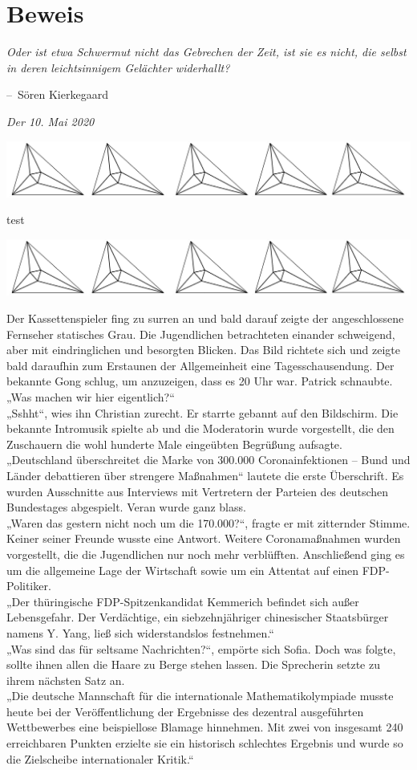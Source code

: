 \documentclass[oneside]{memoir}
\makeatletter
\newcommand{\parasep}{
\bigskip
\bigskip
\begin{center} 
   \includegraphics[scale=.08]{parasep5.jpg} 
\end{center}
\bigskip
\bigskip
}
\newenvironment{chapquote}[2][2em]
  {\setlength{\@tempdima}{#1}%
   \def\chapquote@author{#2}%
   \parshape 1 \@tempdima \dimexpr\textwidth-2\@tempdima\relax%
   \itshape}
  {\par\normalfont\hfill--\ \chapquote@author\hspace*{\@tempdima}\par\bigskip}
\makeatother
\begin{document}
\chapter{Beweis} %
\begin{chapquote}{Sören Kierkegaard}
\glqq Oder ist etwa Schwermut nicht das Gebrechen der Zeit, ist sie es nicht, die selbst in deren leichtsinnigem Gelächter widerhallt?\grqq
\end{chapquote}
     \textit{Der 10. Mai 2020} \\
     
     \parasep
     test
     
     \parasep
     Der Kassettenspieler fing zu surren an und bald darauf zeigte der angeschlossene Fernseher statisches Grau. Die Jugendlichen betrachteten einander schweigend, aber mit eindringlichen und besorgten Blicken. Das Bild richtete sich und zeigte bald daraufhin zum Erstaunen der Allgemeinheit eine Tagesschausendung. Der bekannte Gong schlug, um anzuzeigen, dass es 20 Uhr war. Patrick schnaubte.
„Was machen wir hier eigentlich?“ \\
„Sshht“, wies ihn Christian zurecht. Er starrte gebannt auf den Bildschirm. Die bekannte Intromusik spielte ab und die Moderatorin wurde vorgestellt, die den Zuschauern die wohl hunderte Male eingeübten Begrüßung aufsagte. \\
„Deutschland überschreitet die Marke von 300.000 Coronainfektionen – Bund und Länder debattieren über strengere Maßnahmen“ lautete die erste Überschrift. Es wurden Ausschnitte aus Interviews mit Vertretern der Parteien des deutschen Bundestages abgespielt. Veran wurde ganz blass. \\
„Waren das gestern nicht noch um die 170.000?“, fragte er mit zitternder Stimme. Keiner seiner Freunde wusste eine Antwort. Weitere Coronamaßnahmen wurden vorgestellt, die die Jugendlichen nur noch mehr verblüfften. Anschließend ging es um die allgemeine Lage der Wirtschaft sowie um ein Attentat auf einen FDP-Politiker. \\
„Der thüringische FDP-Spitzenkandidat Kemmerich befindet sich außer Lebensgefahr. Der Verdächtige, ein siebzehnjähriger chinesischer Staatsbürger namens Y. Yang, ließ sich widerstandslos festnehmen.“ \\
„Was sind das für seltsame Nachrichten?“, empörte sich Sofia. Doch was folgte, sollte ihnen allen die Haare zu Berge stehen lassen. Die Sprecherin setzte zu ihrem nächsten Satz an. \\
„Die deutsche Mannschaft für die internationale Mathematikolympiade musste heute bei der Veröffentlichung der Ergebnisse des dezentral ausgeführten Wettbewerbes eine beispiellose Blamage hinnehmen. Mit zwei von insgesamt 240 erreichbaren Punkten erzielte sie ein historisch schlechtes Ergebnis und wurde so die Zielscheibe internationaler Kritik.“
\end{document}
